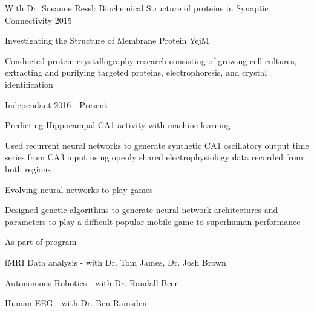 \begin{cventries}
\cvrpentry
    {With Dr. Susanne Ressl: Biochemical Structure of proteins in Synaptic Connectivity} %
    {} %
    {} %
    {2015} %
    {
      \begin{cvrpitems} %
        \item {Investigating the Structure of Membrane Protein YejM}
            \begin{cvitemsdes} 
	     \item{Conducted protein crystallography research consisting of growing cell cultures, extracting and purifying targeted proteins, electrophoresis, and crystal identification}
           \end{cvitemsdes} 
      \end{cvrpitems}
    }

\cvrpentry
    {Independant} %
    {} %
    {} %
    {2016 - Present} %
    {
      \begin{cvrpitems} %
        \item {Predicting Hippocampal CA1 activity with machine learning}
            \begin{cvitemsdes} 
	     \item{Used recurrent neural networks to generate synthetic CA1 oscillatory output time series from CA3 input using openly shared electrophysiology data recorded from both regions}
           \end{cvitemsdes} 
	\item {Evolving neural networks to play games}
            \begin{cvitemsdes} 
	     \item{Designed genetic algorithms to generate neural network architectures and parameters to play a difficult popular mobile game to superhuman performance}
           \end{cvitemsdes} 
      \end{cvrpitems}
    }

\cvrpentry
    {As part of program} %
    {} %
    {} %
    {} %
    {
      \begin{cvrpitems} %
        \item {fMRI Data analysis - with Dr. Tom James, Dr. Josh Brown}
	\item {Autonomous Robotics - with Dr. Randall Beer}
	\item{Human EEG - with Dr. Ben Ramsden }
      \end{cvrpitems}
    }




\end{cventries}
